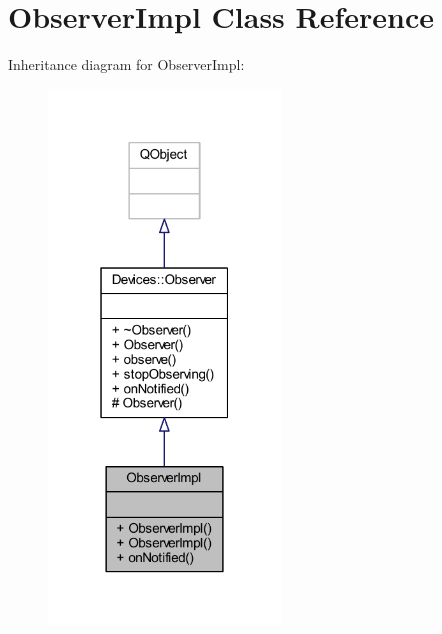 \hypertarget{class_observer_impl}{}\section{Observer\+Impl Class Reference}
\label{class_observer_impl}


Inheritance diagram for Observer\+Impl\+:\nopagebreak
\begin{figure}[H]
\begin{center}
\leavevmode
\includegraphics[width=175pt]{d4/d94/class_observer_impl__inherit__graph}
\end{center}
\end{figure}


